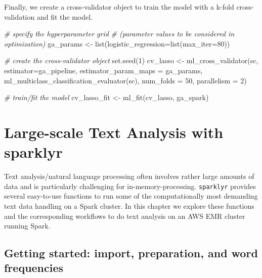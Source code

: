 \documentclass[
  12pt,
]{style/krantz}
\newenvironment{Shaded}{\begin{snugshade}}{\end{snugshade}}
\newcommand{\AttributeTok}[1]{\textcolor[rgb]{0.77,0.63,0.00}{#1}}
\newcommand{\CommentTok}[1]{\textcolor[rgb]{0.56,0.35,0.01}{\textit{#1}}}
\newcommand{\DecValTok}[1]{\textcolor[rgb]{0.00,0.00,0.81}{#1}}
\newcommand{\FunctionTok}[1]{\textcolor[rgb]{0.00,0.00,0.00}{#1}}
\newcommand{\NormalTok}[1]{#1}
\newcommand{\OtherTok}[1]{\textcolor[rgb]{0.56,0.35,0.01}{#1}}
\begin{document}
Finally, we create a cross-validator object to train the model with a k-fold cross-validation and fit the model.

\begin{Shaded}
\begin{Highlighting}[]
\CommentTok{\# specify the hyperparameter grid}
\CommentTok{\# (parameter values to be considered in optimization)}
\NormalTok{ga\_params }\OtherTok{\textless{}{-}} \FunctionTok{list}\NormalTok{(}\AttributeTok{logistic\_regression=}\FunctionTok{list}\NormalTok{(}\AttributeTok{max\_iter=}\DecValTok{80}\NormalTok{))}

\CommentTok{\# create the cross{-}validator object}
\FunctionTok{set.seed}\NormalTok{(}\DecValTok{1}\NormalTok{)}
\NormalTok{cv\_lasso }\OtherTok{\textless{}{-}} \FunctionTok{ml\_cross\_validator}\NormalTok{(sc,}
                         \AttributeTok{estimator=}\NormalTok{ga\_pipeline,}
                         \AttributeTok{estimator\_param\_maps =}\NormalTok{ ga\_params,}
                         \FunctionTok{ml\_multiclass\_classification\_evaluator}\NormalTok{(sc),}
                         \AttributeTok{num\_folds =} \DecValTok{50}\NormalTok{, }
                         \AttributeTok{parallelism =} \DecValTok{2}\NormalTok{)}

\CommentTok{\# train/fit the model}
\NormalTok{cv\_lasso\_fit }\OtherTok{\textless{}{-}} \FunctionTok{ml\_fit}\NormalTok{(cv\_lasso, ga\_spark)}
\end{Highlighting}
\end{Shaded}

\hypertarget{large-scale-text-analysis-with-sparklyr}{%
\chapter{Large-scale Text Analysis with sparklyr}\label{large-scale-text-analysis-with-sparklyr}}

Text analysis/natural language processing often involves rather large amounts of data and is particularly challenging for in-memory-processing. \texttt{sparklyr} provides several easy-to-use functions to run some of the computationally most demanding text data handling on a Spark cluster. In this chapter we explore these functions and the corresponding workflows to do text analysis on an AWS EMR cluster running Spark.

\hypertarget{getting-started-import-preparation-and-word-frequencies}{%
\section{Getting started: import, preparation, and word frequencies}\label{getting-started-import-preparation-and-word-frequencies}}
\end{document}
